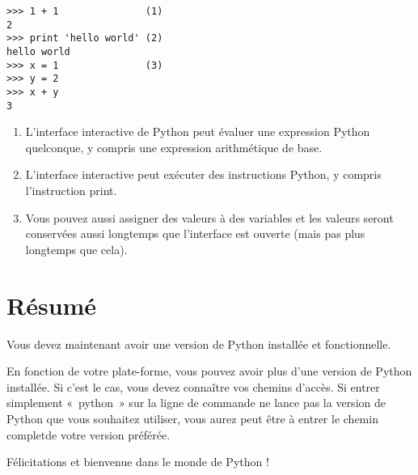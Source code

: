 \begin{example}

\begin{lstlisting}
>>> 1 + 1               (1)
2
>>> print 'hello world' (2)
hello world
>>> x = 1               (3)
>>> y = 2
>>> x + y
3
\end{lstlisting}
\end{example}

\begin{enumerate}
    \item{L'interface interactive de Python peut évaluer une expression Python quelconque, y compris une expression arithmétique de base.}
    \item{L'interface interactive peut exécuter des instructions Python, y compris l'instruction print.}
    \item{Vous pouvez aussi assigner des valeurs à des variables et les valeurs seront conservées aussi longtemps que l'interface est ouverte (mais pas plus longtemps que cela).}
\end{enumerate}

\section{Résumé}\label{Résumé}

Vous devez maintenant avoir une version de Python installée et fonctionnelle.

\medskip
En fonction de votre plate-forme, vous pouvez avoir plus d'une version de Python installée. Si c'est le cas, vous devez connaître vos chemins d'accès. Si entrer simplement  «~python~»  sur la ligne de commande ne lance pas la version de Python que vous souhaitez utiliser, vous aurez peut être à entrer le chemin completde votre version préférée.

\medskip
Félicitations et bienvenue dans le monde de Python !

